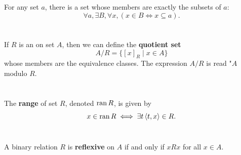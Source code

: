 \documentclass{report}
\newcommand{\pair}[1]{\left< #1 \right>}
\begin{document}
\section{}%

For any set $a$, there is a set whose members are exactly the subsets of $a$:
  $$\forall a, \exists B, \forall x, (x \in B \iff x \subseteq a).$$

\begin{axiom}


\end{axiom}

\section{}%

If $R$ is an  on set $A$, then we can define
  the \textbf{quotient set} $$A / R = \{[x]_R \mid x \in A\}$$ whose members are
  the equivalence classes.
The expression $A / R$ is read "$A$ modulo $R$.

\begin{definition}


\end{definition}

\section{}%

The \textbf{range} of set $R$, denoted $\mathop{\text{ran}}{R}$, is given by
  $$x \in \ran{R} \iff \exists t \pair{t, x} \in R.$$

\begin{definition}


\end{definition}

\section{}%

A binary relation $R$ is \textbf{reflexive} on $A$ if and only if $xRx$ for all
  $x \in A$.
\end{document}
